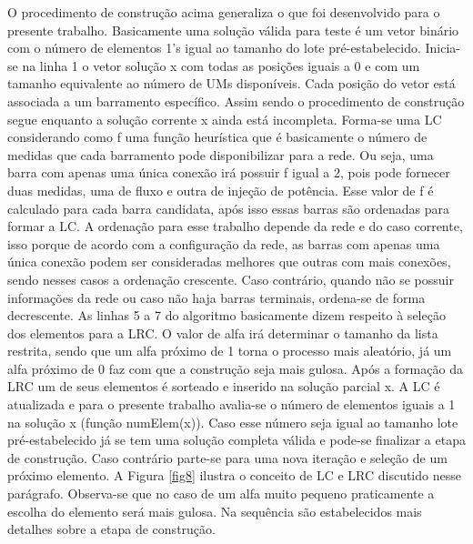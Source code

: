 \documentclass[12pt]{article}
\begin{document}
O procedimento de construção acima generaliza o que foi desenvolvido para o presente trabalho. Basicamente uma solução válida para teste é um vetor binário com o número de elementos 1's igual ao tamanho do lote pré-estabelecido. Inicia-se na linha 1 o vetor solução x com todas as posições iguais a 0 e com um tamanho equivalente ao número de UMs disponíveis. Cada posição do vetor está associada a um barramento específico. Assim sendo o procedimento de construção segue enquanto a solução corrente x ainda está incompleta. Forma-se uma LC considerando como f uma função heurística que é basicamente o número de medidas que cada barramento pode disponibilizar para a rede. Ou seja, uma barra com apenas uma única conexão irá possuir f igual a 2, pois pode fornecer duas medidas, uma de fluxo e outra de injeção de potência. Esse valor de f é calculado para cada barra candidata, após isso essas barras são ordenadas para formar a LC. A ordenação para esse trabalho depende da rede e do caso corrente, isso porque de acordo com a configuração da rede, as barras com apenas uma única conexão podem ser consideradas melhores que outras com mais conexões, sendo nesses casos a ordenação crescente. Caso contrário, quando não se possuir informações da rede ou caso não haja barras terminais, ordena-se de forma decrescente. As linhas 5 a 7 do algoritmo basicamente dizem respeito à seleção dos elementos para a LRC. O valor de alfa irá determinar o tamanho da lista restrita, sendo que um alfa próximo de 1 torna o processo mais aleatório, já um alfa próximo de 0 faz com que a construção seja mais gulosa. Após a formação da LRC um de seus elementos é sorteado e inserido na solução parcial x. A LC é atualizada e para o presente trabalho avalia-se o número de elementos iguais a 1 na solução x (função numElem(x)). Caso esse número seja igual ao tamanho lote pré-estabelecido já se tem uma solução completa válida e pode-se finalizar a etapa de construção. Caso contrário parte-se para uma nova iteração e seleção de um próximo elemento. A Figura \ref{fig8} ilustra o conceito de LC e LRC discutido nesse parágrafo. Observa-se que no caso de um alfa muito pequeno praticamente a escolha do elemento será mais gulosa. Na sequência são estabelecidos mais detalhes sobre a etapa de construção.
\end{document}
